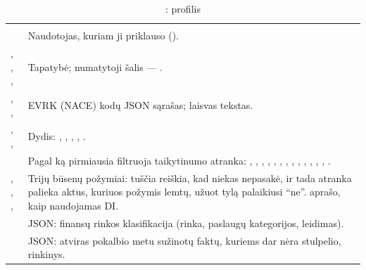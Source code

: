 \begin{xltabular}{\textwidth}{@{}L{38mm}Y@{}}
\caption{: profilis}\label{tab:data:co}\\
\toprule
{} &  \\
\midrule
\endfirsthead
\toprule
{} &  \\
\midrule
\endhead
\bottomrule
\endlastfoot
{} & Naudotojas, kuriam ji priklauso (). \\
, , ,  & Tapatybė; numatytoji šalis --- . \\
, ,  & EVRK (NACE) kodų JSON sąrašas; laisvas tekstas. \\
, ,  & Dydis: , , , , . \\
 & Pagal ką pirmiausia filtruoja taikytinumo atranka: , , , , , , , , , , , , , . \\
, , ,  & Trijų būsenų požymiai: tuščia reiškia, kad niekas nepasakė, ir tada atranka palieka aktus, kuriuos požymis lemtų, užuot tylą palaikiusi \enquote{ne}.  aprašo, kaip naudojamas DI. \\
 & JSON: finansų rinkos klasifikacija (rinka, paslaugų kategorijos, leidimas). \\
 & JSON: atviras pokalbio metu sužinotų faktų, kuriems dar nėra stulpelio, rinkinys. \\
\end{xltabular}

